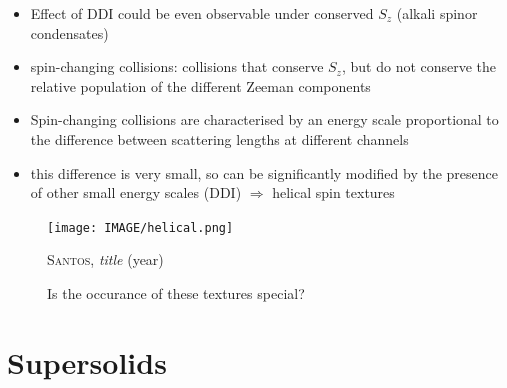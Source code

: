 \begin{itemize}
\begin{itemize}
            \item Effect of DDI could be even observable under conserved $S_{z}$ (alkali spinor condensates)
            \item spin-changing collisions: collisions that conserve $S_{z}$, but do not conserve the relative population of the different Zeeman components
            \item Spin-changing collisions are characterised by an energy scale proportional
to the difference between scattering lengths at different channels
            \item this difference is very small, so can be significantly modified by the presence of other small energy scales (DDI) $\Rightarrow$ helical spin textures
        \end{itemize}
\end{itemize}

\begin{figure}[H]
    \centering
    \texttt{[image: IMAGE/helical.png]}\\
    \caption{Is the occurance of these textures special?}
    \textsc{Santos}, \emph{title} (year)
    \label{fig:helical}
\end{figure}

\section{Supersolids}

